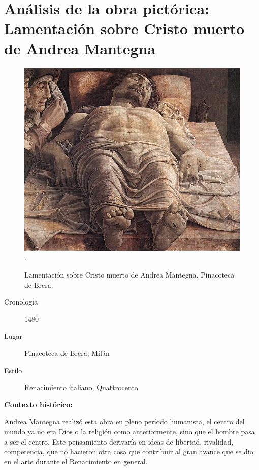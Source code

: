 \section{Análisis de la obra pictórica: Lamentación sobre Cristo muerto de Andrea Mantegna}

\begin{figure}[ht!]
	\includegraphics[width=\textwidth]{mantegna.jpg}
   .\caption{Lamentación sobre Cristo muerto de Andrea Mantegna. Pinacoteca de Brera.} %
\end{figure}

\newpage

\begin{description}
\item[Cronología] 1480
\item[Lugar] Pinacoteca de Brera, Milán
\item[Estilo] Renacimiento italiano, Quattrocento
\end{description}

\textbf{Contexto histórico:}

Andrea Mantegna realizó esta obra en pleno período humanista, el centro del mundo ya no era Dios o la religión como anteriormente, sino que el hombre pasa a ser el centro. Este pensamiento derivaría en ideas de libertad, rivalidad, competencia, que no hacieron otra cosa que contribuir al gran avance que se dio en el arte durante el Renacimiento en general.

